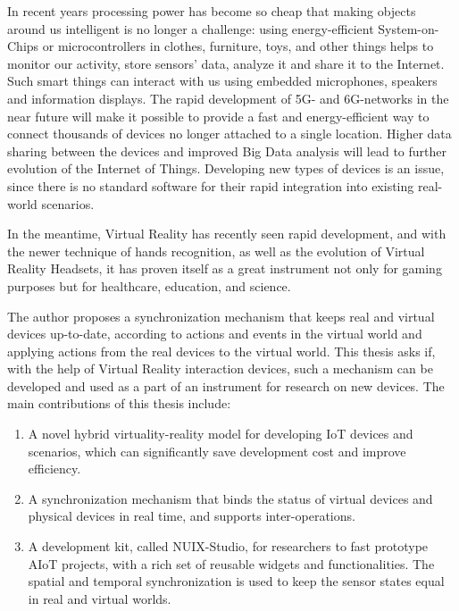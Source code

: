 \begin{abstract*}

  In recent years processing power has become so cheap that making objects around us intelligent is no longer a challenge: using energy-efficient System-on-Chips or microcontrollers in clothes, furniture, toys, and other things helps to monitor our activity, store sensors' data, analyze it and share it to the Internet. Such smart things can interact with us using embedded microphones, speakers and information displays. The rapid development of 5G- and 6G-networks in the near future will make it possible to provide a fast and energy-efficient way to connect thousands of devices no longer attached to a single location. Higher data sharing between the devices and improved Big Data analysis will lead to further evolution of the Internet of Things. Developing new types of devices is an issue, since there is no standard software for their rapid integration into existing real-world scenarios.
   
  In the meantime, Virtual Reality has recently seen rapid development, and with the newer technique of hands recognition, as well as the evolution of Virtual Reality Headsets, it has proven itself as a great instrument not only for gaming purposes but for healthcare, education, and science.
   
  The author proposes a synchronization mechanism that keeps real and virtual devices up-to-date, according to actions and events in the virtual world and applying actions from the real devices to the virtual world. This thesis asks if, with the help of Virtual Reality interaction devices, such a mechanism can be developed and used as a part of an instrument for research on new devices. The main contributions of this thesis include:
  
  \begin{enumerate}
      \item A novel hybrid virtuality-reality model for developing IoT devices and scenarios, which can significantly save development cost and improve efficiency. 
      \item A synchronization mechanism that binds the status of virtual devices and physical devices in real time, and supports inter-operations. 
      \item A development kit, called NUIX-Studio, for researchers to fast prototype AIoT projects, with a rich set of reusable widgets and functionalities. The spatial and temporal synchronization is used to keep the sensor states equal in real and virtual worlds.
  \end{enumerate}
  
\end{abstract*}
